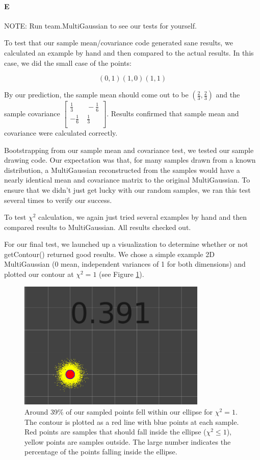 \documentclass[12pt]{article}
\begin{document}
\paragraph{E}
NOTE: Run team.MultiGaussian to see our tests for yourself.

To test that our sample mean/covariance code generated sane results,
we calculated an example by hand and then compared to the actual results.
In this case, we did the small case of the points:

\[(0,1) (1,0) (1,1)\]

By our prediction, the sample mean should come out to be $(\frac{2}{3}, \frac{2}{3})$
and the sample covariance
$\left[ {\begin{smallmatrix}
\frac{1}{3} & \;-\frac{1}{6} \\
-\frac{1}{6} & \;\frac{1}{3} \\
\end{smallmatrix} } \right]$.
Results confirmed that sample mean and covariance were calculated correctly.

Bootstrapping from our sample mean and covariance test, we tested our sample
drawing code. Our expectation was that, for many samples drawn from a known
distribution, a MultiGaussian reconstructed from the samples would have a
nearly identical mean and covariance matrix to the original MultiGaussian.
To ensure that we didn't just get lucky with our random samples, we ran
this test several times to verify our success.

To test $\chi^{2}$ calculation, we again just tried several examples by hand and
then compared results to MultiGaussian. All results checked out.

For our final test, we launched up a visualization to determine whether or not
getContour() returned good results. We chose a simple example 2D MultiGaussian
(0 mean, independent variances of 1 for both dimensions) and plotted our contour
at $\chi^{2} = 1$ (see Figure \ref{fig:multigaussian}).

\begin{figure}
\centering
\includegraphics[width=0.8\textwidth]{figures/MultiGaussian_1_sigma.png}
\caption{Around 39\% of our sampled points fell within our ellipse for $\chi^{2} = 1$.
The contour is plotted as a red line with blue points at each sample. Red points are
samples that should fall inside the ellipse ($\chi^{2} \leq 1$), yellow points are
samples outside. The large number indicates the percentage of the points falling inside
the ellipse.}
\label{fig:multigaussian}
\end{figure}
\end{document}
